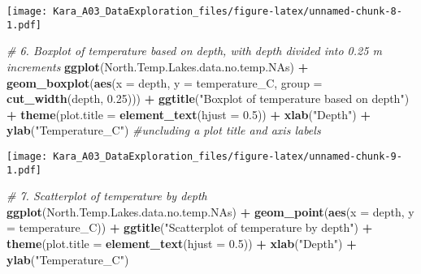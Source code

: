 \documentclass[]{article}
\newenvironment{Shaded}{\begin{snugshade}}{\end{snugshade}}
\newcommand{\KeywordTok}[1]{\textcolor[rgb]{0.13,0.29,0.53}{\textbf{#1}}}
\newcommand{\DataTypeTok}[1]{\textcolor[rgb]{0.13,0.29,0.53}{#1}}
\newcommand{\FloatTok}[1]{\textcolor[rgb]{0.00,0.00,0.81}{#1}}
\newcommand{\StringTok}[1]{\textcolor[rgb]{0.31,0.60,0.02}{#1}}
\newcommand{\CommentTok}[1]{\textcolor[rgb]{0.56,0.35,0.01}{\textit{#1}}}
\newcommand{\OperatorTok}[1]{\textcolor[rgb]{0.81,0.36,0.00}{\textbf{#1}}}
\newcommand{\NormalTok}[1]{#1}
\begin{document}
\texttt{[image: Kara\_A03\_DataExploration\_files/figure-latex/unnamed-chunk-8-1.pdf]}

\begin{Shaded}
\begin{Highlighting}[]
\CommentTok{# 6. Boxplot of temperature based on depth, with depth divided into 0.25 m increments}
\KeywordTok{ggplot}\NormalTok{(North.Temp.Lakes.data.no.temp.NAs) }\OperatorTok{+}
\StringTok{  }\KeywordTok{geom_boxplot}\NormalTok{(}\KeywordTok{aes}\NormalTok{(}\DataTypeTok{x =}\NormalTok{ depth, }\DataTypeTok{y =}\NormalTok{ temperature_C, }\DataTypeTok{group =} \KeywordTok{cut_width}\NormalTok{(depth, }\FloatTok{0.25}\NormalTok{))) }\OperatorTok{+}\StringTok{ }
\StringTok{  }\KeywordTok{ggtitle}\NormalTok{(}\StringTok{"Boxplot of temperature based on depth"}\NormalTok{) }\OperatorTok{+}\StringTok{ }
\StringTok{  }\KeywordTok{theme}\NormalTok{(}\DataTypeTok{plot.title =} \KeywordTok{element_text}\NormalTok{(}\DataTypeTok{hjust =} \FloatTok{0.5}\NormalTok{)) }\OperatorTok{+}\StringTok{ }\KeywordTok{xlab}\NormalTok{(}\StringTok{"Depth"}\NormalTok{) }\OperatorTok{+}\StringTok{ }
\StringTok{  }\KeywordTok{ylab}\NormalTok{(}\StringTok{"Temperature_C"}\NormalTok{) }\CommentTok{#uncluding a plot title and axis labels}
\end{Highlighting}
\end{Shaded}

\texttt{[image: Kara\_A03\_DataExploration\_files/figure-latex/unnamed-chunk-9-1.pdf]}

\begin{Shaded}
\begin{Highlighting}[]
\CommentTok{# 7. Scatterplot of temperature by depth}
\KeywordTok{ggplot}\NormalTok{(North.Temp.Lakes.data.no.temp.NAs) }\OperatorTok{+}
\StringTok{  }\KeywordTok{geom_point}\NormalTok{(}\KeywordTok{aes}\NormalTok{(}\DataTypeTok{x =}\NormalTok{ depth, }\DataTypeTok{y =}\NormalTok{ temperature_C)) }\OperatorTok{+}\StringTok{ }\KeywordTok{ggtitle}\NormalTok{(}\StringTok{"Scatterplot of temperature by depth"}\NormalTok{) }\OperatorTok{+}\StringTok{ }
\StringTok{  }\KeywordTok{theme}\NormalTok{(}\DataTypeTok{plot.title =} \KeywordTok{element_text}\NormalTok{(}\DataTypeTok{hjust =} \FloatTok{0.5}\NormalTok{)) }\OperatorTok{+}\StringTok{ }\KeywordTok{xlab}\NormalTok{(}\StringTok{"Depth"}\NormalTok{) }\OperatorTok{+}\StringTok{ }\KeywordTok{ylab}\NormalTok{(}\StringTok{"Temperature_C"}\NormalTok{)}
\end{Highlighting}
\end{Shaded}
\end{document}
